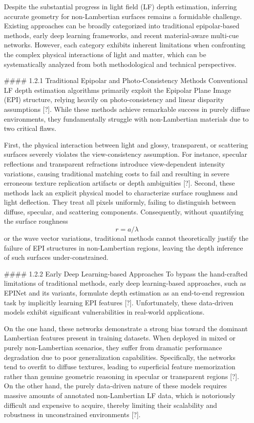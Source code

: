 Despite the substantial progress in light field (LF) depth estimation, inferring accurate geometry for non-Lambertian surfaces remains a formidable challenge. Existing approaches can be broadly categorized into traditional epipolar-based methods, early deep learning frameworks, and recent material-aware multi-cue networks. However, each category exhibits inherent limitations when confronting the complex physical interactions of light and matter, which can be systematically analyzed from both methodological and technical perspectives.

\#\#\#\# 1.2.1 Traditional Epipolar and Photo-Consistency Methods
Conventional LF depth estimation algorithms primarily exploit the Epipolar Plane Image (EPI) structure, relying heavily on photo-consistency and linear disparity assumptions [?]. While these methods achieve remarkable success in purely diffuse environments, they fundamentally struggle with non-Lambertian materials due to two critical flaws. 

First, the physical interaction between light and glossy, transparent, or scattering surfaces severely violates the view-consistency assumption. For instance, specular reflections and transparent refractions introduce view-dependent intensity variations, causing traditional matching costs to fail and resulting in severe erroneous texture replication artifacts or depth ambiguities [?]. Second, these methods lack an explicit physical model to characterize surface roughness and light deflection. They treat all pixels uniformly, failing to distinguish between diffuse, specular, and scattering components. Consequently, without quantifying the surface roughness \[
r = a/\lambda
\] or the wave vector variations, traditional methods cannot theoretically justify the failure of EPI structures in non-Lambertian regions, leaving the depth inference of such surfaces under-constrained.

\#\#\#\# 1.2.2 Early Deep Learning-based Approaches
To bypass the hand-crafted limitations of traditional methods, early deep learning-based approaches, such as EPINet and its variants, formulate depth estimation as an end-to-end regression task by implicitly learning EPI features [?]. Unfortunately, these data-driven models exhibit significant vulnerabilities in real-world applications. 

On the one hand, these networks demonstrate a strong bias toward the dominant Lambertian features present in training datasets. When deployed in mixed or purely non-Lambertian scenarios, they suffer from dramatic performance degradation due to poor generalization capabilities. Specifically, the networks tend to overfit to diffuse textures, leading to superficial feature memorization rather than genuine geometric reasoning in specular or transparent regions [?]. On the other hand, the purely data-driven nature of these models requires massive amounts of annotated non-Lambertian LF data, which is notoriously difficult and expensive to acquire, thereby limiting their scalability and robustness in unconstrained environments [?].

